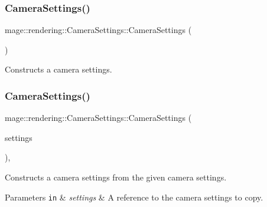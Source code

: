 \subsubsection{\texorpdfstring{Camera\+Settings()}{CameraSettings()}\hspace{0.1cm}{\footnotesize\ttfamily [1/3]}}
{\footnotesize\ttfamily mage\+::rendering\+::\+Camera\+Settings\+::\+Camera\+Settings (\begin{DoxyParamCaption}{ }\end{DoxyParamCaption})\hspace{0.3cm}{\ttfamily [noexcept]}}

Constructs a camera settings. \mbox{\label{classmage_1_1rendering_1_1_camera_settings_af0501d9365b74ce296a517b40a13e81e}} 
\subsubsection{\texorpdfstring{Camera\+Settings()}{CameraSettings()}\hspace{0.1cm}{\footnotesize\ttfamily [2/3]}}
{\footnotesize\ttfamily mage\+::rendering\+::\+Camera\+Settings\+::\+Camera\+Settings (\begin{DoxyParamCaption}\item[{const \mbox{\hyperlink{classmage_1_1rendering_1_1_camera_settings}{Camera\+Settings}} \&}]{settings }\end{DoxyParamCaption})\hspace{0.3cm}{\ttfamily [default]}, {\ttfamily [noexcept]}}

Constructs a camera settings from the given camera settings.


\begin{DoxyParams}[1]{Parameters}
\mbox{\tt in}  & {\em settings} & A reference to the camera settings to copy. \\
\hline
\end{DoxyParams}
\mbox{\label{classmage_1_1rendering_1_1_camera_settings_a08e6d9c319feb6af0c14f4d057220da8}} 
